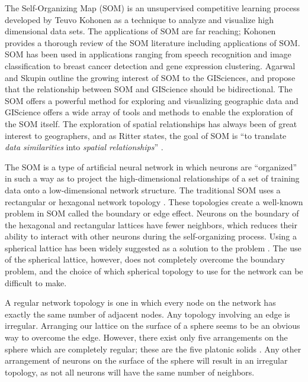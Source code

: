 
The Self-Organizing Map (SOM) is an unsupervised competitive learning process
developed by Teuvo Kohonen as a technique to analyze and visualize high
dimensional data sets.  The applications of SOM are far reaching;
Kohonen \cite{Kohonen2000} provides a thorough review of the SOM literature including
applications of SOM.  SOM has been used in applications ranging from speech
recognition and image classification to breast cancer detection and gene
expression clustering.  Agarwal
and Skupin \cite{skupin08} outline the growing interest of SOM to
the GISciences, and propose that the relationship between SOM and GIScience
should be bidirectional.  The SOM offers a powerful method for exploring and
visualizing geographic data and GIScience offers a wide array of tools
and methods to enable the exploration of the SOM itself.  The exploration of
spatial relationships has always been of great interest to geographers, and as
Ritter
 states, the goal of SOM is ``to translate \emph{data
similarities} into \emph{spatial relationships}'' \cite[p. 1]{ritter99}. 

The SOM is a type of artificial neural network in which neurons are ``organized''
in such a way as to project the high-dimensional relationships of a set of
training data onto a low-dimensional network structure.  The traditional
SOM uses a rectangular or hexagonal network topology \cite{Kohonen2000}.  These topologies 
create a well-known problem in SOM called the boundary or edge effect.  Neurons on
the boundary of the hexagonal and rectangular lattices have fewer neighbors,
which reduces their ability to interact with other neurons during the
self-organizing process.  Using a spherical lattice has been widely suggested as a
solution to the problem \cite{ritter99, boudjemai2003, sangole03,
Nishio:2006fk, wu2006}. The use of the spherical lattice, however, does not
completely overcome the boundary problem, and the choice of which spherical
topology to use for the network can be difficult to make.

A regular network topology is one in which every node on the network has exactly the
same number of adjacent nodes.  Any topology involving an edge is irregular.
Arranging our lattice on the surface of a sphere seems to be an obvious
way to overcome the edge.  However, there exist only five arrangements on the
sphere which are completely regular; these are the five platonic solids \cite{ritter99,
harris2000}.  Any other arrangement of neurons on the surface of the sphere will
result in an irregular topology, as not all neurons will have the same number of
neighbors.

